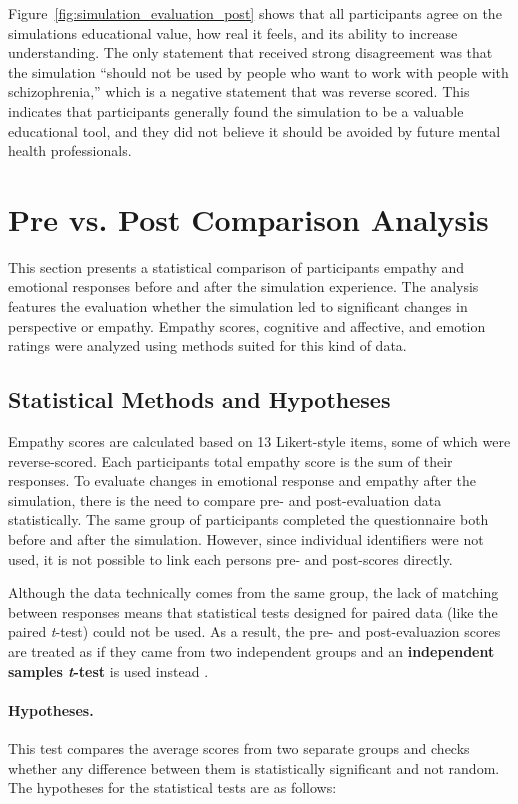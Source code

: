 Figure~\ref{fig:simulation_evaluation_post} shows that all participants agree on the simulations educational value, how real it feels, and its ability to increase understanding. The only statement that received strong disagreement was that the simulation “should not be used by people who want to work with people with schizophrenia,” which is a negative statement that was reverse scored. This indicates that participants generally found the simulation to be a valuable educational tool, and they did not believe it should be avoided by future mental health professionals.

\section{Pre vs. Post Comparison Analysis}
\label{sec:pre_post_comparison}
This section presents a statistical comparison of participants empathy and emotional responses before and after the simulation experience. The analysis features the evaluation whether the simulation led to significant changes in perspective or empathy. Empathy scores, cognitive and affective, and emotion ratings were analyzed using methods suited for this kind of data.

\subsection{Statistical Methods and Hypotheses}

Empathy scores are calculated based on 13 Likert-style items, some of which were reverse-scored. Each participants total empathy score is the sum of their responses. To evaluate changes in emotional response and empathy after the simulation, there is the need to compare pre- and post-evaluation data statistically. The same group of participants completed the questionnaire both before and after the simulation. However, since individual identifiers were not used, it is not possible to link each persons pre- and post-scores directly.

Although the data technically comes from the same group, the lack of matching between responses means that statistical tests designed for paired data (like the paired \textit{t}-test) could not be used. As a result, the pre- and post-evaluazion scores are treated as if they came from two independent groups and an \textbf{independent samples \textit{t}-test} is used instead \cite{independentTtest}.

\paragraph{Hypotheses.} This test compares the average scores from two separate groups and checks whether any difference between them is statistically significant and not random. The hypotheses for the statistical tests are as follows:

